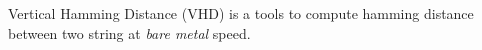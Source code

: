 Vertical Hamming Distance (VHD) is a tools to compute hamming distance between two string at \textit{bare metal} speed. 
  